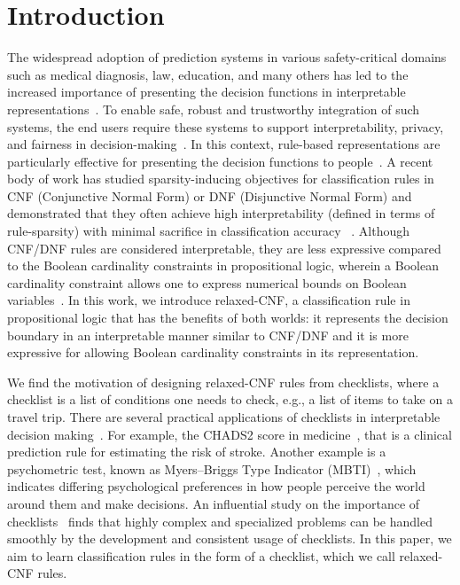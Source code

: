 \section{Introduction}
\label{interpretability_crr_sec:introduction}


The widespread adoption of prediction systems in various safety-critical domains such as medical diagnosis, law, education, and many others has led to the increased importance of presenting the decision functions in interpretable representations~\cite{K2001,MVBB2005,SAD2015,S2014,TV2013}.  To enable  safe, robust and trustworthy integration of such systems, the end users require these systems to support interpretability, privacy, and fairness in decision-making~\cite{DF2018,VML2012,WRLKM2015,ZUR2017}.
In this context,  rule-based representations are particularly effective for  presenting the decision functions to people~\cite{LKCL2019,MM18,WR2015,WRDLKM2017}.
A recent body of work has studied sparsity-inducing objectives for classification rules in CNF ({Conjunctive Normal Form}) or DNF ({Disjunctive Normal Form}) and demonstrated that they often achieve high interpretability (defined in terms of rule-sparsity) with minimal sacrifice in classification accuracy ~\cite{ghosh19incremental,LKCL2019,MM18}. Although CNF/DNF rules are considered interpretable, they are less expressive compared to the Boolean cardinality constraints in propositional logic, wherein a Boolean cardinality constraint allows one to express numerical bounds on Boolean variables~\cite{sinz2005towards}.  
In this work, we introduce relaxed-CNF,  a classification rule in propositional logic that has the benefits of  both worlds: it represents the decision boundary in an interpretable manner similar to CNF/DNF  and it is more expressive  for allowing Boolean cardinality constraints in its representation.


 We find the motivation of designing relaxed-CNF rules from checklists, where a checklist is a list of conditions one needs to check, e.g., a list of items to take on a travel trip.  There are several practical applications of checklists in interpretable decision making~\cite{M1976,gage2001validation}. For example, the  CHADS2 score in medicine~\cite{gage2001validation}, that is a clinical prediction rule for estimating the risk of stroke.
Another example is a psychometric test, known as Myers–Briggs Type Indicator (MBTI)~\cite{M1976}, which indicates differing psychological preferences in how people
perceive the world around them and make decisions.  An influential study on the importance of {checklists}~\cite{G2010} finds that highly complex and specialized problems can be handled smoothly by the development and consistent usage of checklists. In this paper, we aim to learn  classification rules in the form of a checklist, which we call relaxed-CNF rules. 







